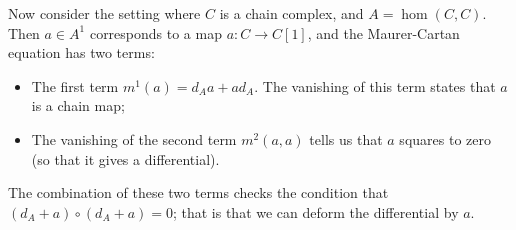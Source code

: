     Now consider the setting where $C$ is a chain complex, and $A=\hom(C, C)$. Then $a\in A^1$ corresponds to a map $a: C\to C[1]$, and the Maurer-Cartan equation has two terms:
    \begin{itemize}
        \item The first term $m^1(a) = d_A a + a d_A$. The vanishing of this term states that $a$ is a chain map;
        \item The vanishing of the second term $m^2(a, a)$ tells us that $a$ squares to zero (so that it gives a differential).
    \end{itemize}
    The combination of these two terms checks the condition that $(d_A+a)\circ (d_A+a)=0$; that is that we can deform the differential by $a$.
 